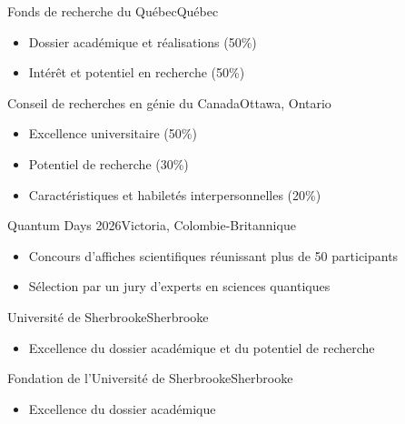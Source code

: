 

{Fonds de recherche du Québec}{Québec}
{\vspace{-12pt}
\begin{itemize}
    \item Dossier académique et réalisations (50\%)
    \item Intérêt et potentiel en recherche (50\%)
\end{itemize}}

{Conseil de recherches en génie du Canada}{Ottawa, Ontario}
{\vspace{-12pt}
\begin{itemize}
    \item Excellence universitaire (50\%)
    \item Potentiel de recherche (30\%)
    \item Caractéristiques et habiletés interpersonnelles (20\%)
\end{itemize}}

{Quantum Days 2026}{Victoria, Colombie-Britannique}
{\vspace{-12pt}
\begin{itemize}
    \item Concours d'affiches scientifiques réunissant plus de 50 participants
    \item Sélection par un jury d'experts en sciences quantiques
\end{itemize}}

{Université de Sherbrooke}{Sherbrooke}
{\vspace{-12pt}
\begin{itemize}
    \item Excellence du dossier académique et du potentiel de recherche
\end{itemize}}

{Fondation de l'Université de Sherbrooke}{Sherbrooke}
{\vspace{-12pt}
\begin{itemize}
    \item Excellence du dossier académique
\end{itemize}}

